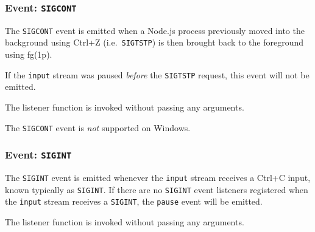 \subsubsection{\texorpdfstring{Event:
\texttt{\textquotesingle{}SIGCONT\textquotesingle{}}}{Event: \textquotesingle SIGCONT\textquotesingle{}}}\label{event-sigcont}

The \texttt{\textquotesingle{}SIGCONT\textquotesingle{}} event is
emitted when a Node.js process previously moved into the background
using Ctrl+Z (i.e.~\texttt{SIGTSTP}) is then brought back to the
foreground using fg(1p).

If the \texttt{input} stream was paused \emph{before} the
\texttt{SIGTSTP} request, this event will not be emitted.

The listener function is invoked without passing any arguments.

\begin{Shaded}
\begin{Highlighting}[]
\NormalTok{(}\OperatorTok{,}\NormalTok{ () }\KeywordTok{=\textgreater{}}\NormalTok{ \{}
\NormalTok{()}\OperatorTok{;}
\NormalTok{\})}\OperatorTok{;}
\end{Highlighting}
\end{Shaded}

The \texttt{\textquotesingle{}SIGCONT\textquotesingle{}} event is
\emph{not} supported on Windows.

\subsubsection{\texorpdfstring{Event:
\texttt{\textquotesingle{}SIGINT\textquotesingle{}}}{Event: \textquotesingle SIGINT\textquotesingle{}}}\label{event-sigint}

The \texttt{\textquotesingle{}SIGINT\textquotesingle{}} event is emitted
whenever the \texttt{input} stream receives a Ctrl+C input, known
typically as \texttt{SIGINT}. If there are no
\texttt{\textquotesingle{}SIGINT\textquotesingle{}} event listeners
registered when the \texttt{input} stream receives a \texttt{SIGINT},
the \texttt{\textquotesingle{}pause\textquotesingle{}} event will be
emitted.

The listener function is invoked without passing any arguments.

